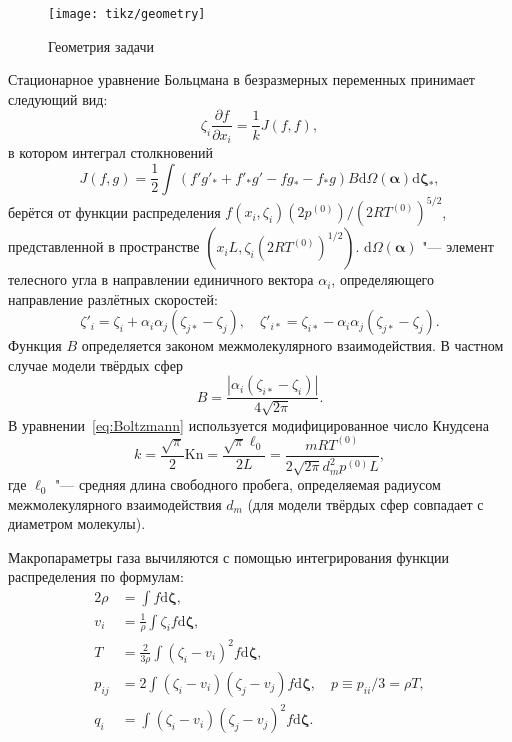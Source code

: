 \documentclass[a4paper,12pt]{article}
\newcommand{\Kn}{\mathrm{Kn}}
\newcommand{\dd}{\mathrm{d}}
\newcommand{\pder}[2][]{\frac{\partial#1}{\partial#2}}
\begin{document}
\begin{figure}[ht]
    \centering
    \texttt{[image: tikz/geometry]}
    \caption{Геометрия задачи}
    \label{fig:geometry}
\end{figure}

Стационарное уравнение Больцмана в безразмерных переменных принимает следующий вид:
\begin{equation}\label{eq:Boltzmann}
    \zeta_i\pder[f]{x_i} = \frac1k J(f,f),
\end{equation}
в котором интеграл столкновений
\begin{equation}
    J(f,g) = \frac12 \int (f'g'_* + f'_*g' - fg_* - f_*g) B
    \dd \Omega(\boldsymbol{\alpha}) \boldsymbol{\dd \zeta_*},
\end{equation}
берётся от функции распределения \(f(x_i,\zeta_i)(2p^{(0)})/(2RT^{(0)})^{5/2}\), представленной
в пространстве \((x_iL, \zeta_i(2RT^{(0)})^{1/2})\).
\(\dd \Omega(\boldsymbol{\alpha})\) "--- элемент телесного угла в направлении единичного вектора \(\alpha_i\),
определяющего направление разлётных скоростей:
\[
    \zeta'_i = \zeta_i + \alpha_i\alpha_j(\zeta_{j*}-\zeta_j), \quad
    \zeta'_{i*} = \zeta_{i*} - \alpha_i\alpha_j(\zeta_{j*}-\zeta_j).
\]
Функция \(B\) определяется законом межмолекулярного взаимодействия.
В частном случае модели твёрдых сфер
\begin{equation}
    B = \frac{|\alpha_i(\zeta_{i*}-\zeta_i)|}{4\sqrt{2\pi}}.
\end{equation}
В уравнении~\eqref{eq:Boltzmann} используется модифицированное число Кнудсена
\begin{equation}
    k = \frac{\sqrt\pi}2 \Kn = \frac{\sqrt\pi\ell_0}{2L} =
    \frac{mRT^{(0)}}{2\sqrt{2\pi} d_m^2p^{(0)}L},
\end{equation}
где \(\ell_0\) "--- средняя длина свободного пробега, определяемая радиусом межмолекулярного
взаимодействия \(d_m\) (для модели твёрдых сфер совпадает с диаметром молекулы).

Макропараметры газа вычиляются с помощью интегрирования функции распределения по формулам:
\begin{alignat*}{2}
    \rho &= \int f \boldsymbol{\dd\zeta}, \\
    v_i &= \frac1{\rho} \int \zeta_i f \boldsymbol{\dd\zeta}, \\
    T &= \frac{2}{3\rho}\int(\zeta_i-v_i)^2 f \boldsymbol{\dd\zeta}, \\
    p_{ij} &= 2 \int(\zeta_i-v_i)(\zeta_j-v_j) f \boldsymbol{\dd\zeta},
        \quad p \equiv p_{ii}/3 = \rho T, \\
    q_i &= \int(\zeta_i-v_i)(\zeta_j-v_j)^2 f \boldsymbol{\dd\zeta}.
\end{alignat*}
\end{document}
